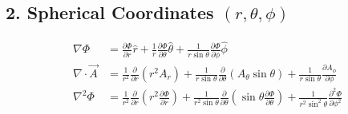 \subsection{2. Spherical Coordinates $(r, \theta, \phi)$}
\begin{align}
\nabla \Phi &= \frac{\partial \Phi}{\partial r}\hat{r} + \frac{1}{r}\frac{\partial \Phi}{\partial \theta}\hat{\theta} + \frac{1}{r\sin\theta}\frac{\partial \Phi}{\partial \phi}\hat{\phi} \\
\nabla \cdot \vec{A} &= \frac{1}{r^2}\frac{\partial}{\partial r}(r^2 A_r) + \frac{1}{r\sin\theta}\frac{\partial}{\partial \theta}(A_\theta \sin\theta) + \frac{1}{r\sin\theta}\frac{\partial A_\phi}{\partial \phi} \\
\nabla^2 \Phi &= \frac{1}{r^2}\frac{\partial}{\partial r}\left(r^2 \frac{\partial \Phi}{\partial r}\right) + \frac{1}{r^2 \sin\theta}\frac{\partial}{\partial \theta}\left(\sin\theta \frac{\partial \Phi}{\partial \theta}\right) + \frac{1}{r^2 \sin^2\theta}\frac{\partial^2 \Phi}{\partial \phi^2}
\end{align}

